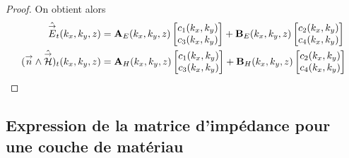 \begin{proof}
            On obtient alors
            \begin{align*}
                \hat{{\overset{\rightarrow}{E}}}_t(k_x,k_y,z) &= \mathbf{A}_E(k_x,k_y,z) \begin{bmatrix}c_1(k_x,k_y) \\ c_3(k_x,k_y)\end{bmatrix} + \mathbf{B}_E(k_x,k_y,z) \begin{bmatrix}c_2(k_x,k_y) \\ c_4(k_x,k_y)\end{bmatrix}
                \\
                ({\overset{\rightarrow}{n}} \wedge \hat{{\overset{\rightarrow}{\mathcal{H}}}})_t(k_x,k_y,z) &= \mathbf{A}_H(k_x,k_y,z) \begin{bmatrix}c_1(k_x,k_y) \\ c_3(k_x,k_y)\end{bmatrix} + \mathbf{B}_H(k_x,k_y,z) \begin{bmatrix}c_2(k_x,k_y) \\ c_4(k_x,k_y)\end{bmatrix}
            \end{align*}
        \end{proof}




    \subsection{Expression de la matrice d'impédance pour une couche de matériau}

